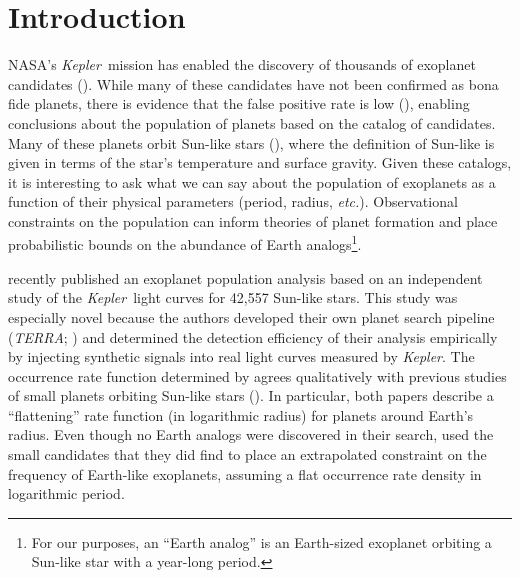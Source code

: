 \documentclass[12pt,preprint]{aastex}
\newcommand{\project}[1]{\emph{#1}}
\newcommand{\kepler}{\project{Kepler}}
\newcommand{\terra}{\project{TERRA}}
\newcommand{\foreign}[1]{\emph{#1}}
\newcommand{\etc}{\foreign{etc.}}
\newcommand{\sectlabel}[1]{\label{sect:#1}}
\begin{document}

\section{Introduction}
\sectlabel{intro}

NASA's \kepler\ mission has enabled the discovery of thousands of exoplanet
candidates (\citealt{kepler-catalog, burke}).
While many of these candidates have not been confirmed as bona fide planets,
there is evidence that the false positive rate is low (\citealt{morton,
fressin-fp}), enabling conclusions about the population of planets based on
the catalog of candidates.
Many of these planets orbit Sun-like stars (\citealt{petigura}), where the
definition of Sun-like is given in terms of the star's temperature and surface
gravity.
Given these catalogs, it is interesting to ask what we can say about the
population of exoplanets as a function of their physical parameters
(period, radius, \etc).
Observational constraints on the population can inform theories of planet
formation and place probabilistic bounds on the abundance of Earth
analogs\footnote{For our purposes, an ``Earth analog'' is an Earth-sized
exoplanet orbiting a Sun-like star with a year-long period.}.

\citet{petigura} recently published an exoplanet population analysis based on
an independent study of the \kepler\ light curves for 42,557 Sun-like stars.
This study was especially novel because the authors developed their own
planet search pipeline (\terra; \citealt{petigura-a}) and determined the
detection efficiency of their analysis empirically by injecting synthetic
signals into real light curves measured by \kepler.
The occurrence rate function determined by \citet{petigura} agrees
qualitatively with previous studies of small planets orbiting Sun-like stars
(\citealt{dong}).
In particular, both papers describe a ``flattening'' rate function (in
logarithmic radius) for planets around Earth's radius.
Even though no Earth analogs were discovered in their search, \citet{petigura}
used the small candidates that they did find to place an extrapolated
constraint on the frequency of Earth-like exoplanets, assuming a flat
occurrence rate density in logarithmic period.
\end{document}
